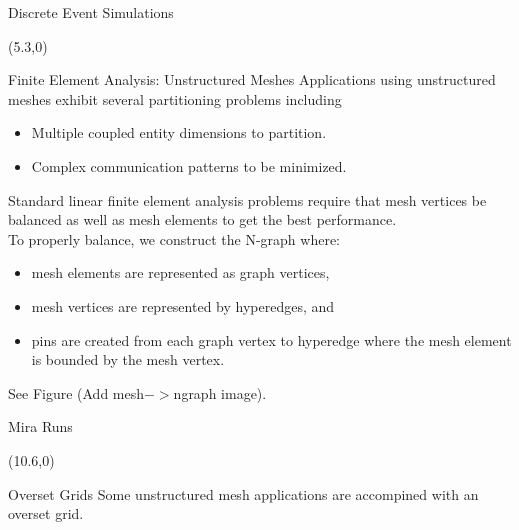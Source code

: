 \documentclass{beamer}
\begin{document}
\begin{textblock}{15.6}
\begin{textblock}{5}
\begin{block}{Discrete Event Simulations}
          \end{block}
        \end{textblock}
        \begin{textblock}{5}(5.3,0)
          \begin{block}{Finite Element Analysis: Unstructured Meshes}
            Applications using unstructured meshes exhibit several partitioning problems including
            \begin{itemize}
            \item Multiple coupled entity dimensions to partition.
            \item Complex communication patterns to be minimized.
            \end{itemize}
            Standard linear finite element analysis problems require that mesh vertices be balanced as well as mesh elements to get the best performance.\\
            To properly balance, we construct the N-graph where:
            \begin{itemize}
              \item mesh elements are represented as graph vertices,
              \item mesh vertices are represented by hyperedges, and
              \item pins are created from each graph vertex to hyperedge where the mesh element is bounded by the mesh vertex.
            \end{itemize}
            See Figure (Add mesh$->$ngraph image).

          \end{block}
          \begin{block}{Mira Runs}
            
          \end{block}
        \end{textblock}
        \begin{textblock}{5}(10.6,0)
          \begin{block}{Overset Grids}
            Some unstructured mesh applications are accompined with an overset grid.

            

\end{block}
\end{textblock}
\end{textblock}
\end{document}
